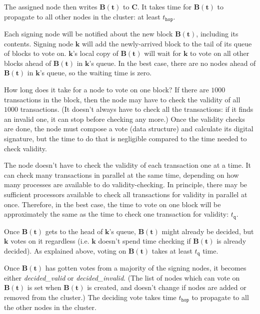 The assigned node then writes $\mathbf{B}(\mathbf{t})$ to $\mathbf{C}$. It takes time for $\mathbf{B}(\mathbf{t})$ to propagate to all other nodes in the cluster: at least $t_\mathtt{hop}$.

Each signing node will be notified about the new block $\mathbf{B}(\mathbf{t})$, including its contents. Signing node $\mathbf{k}$ will add the newly-arrived block to the tail of its queue of blocks to vote on. 
$\mathbf{k}$’s local copy of $\mathbf{B}(\mathbf{t})$ will wait for $\mathbf{k}$ to vote on all other blocks ahead of $\mathbf{B}(\mathbf{t})$ in $\mathbf{k}$’s queue. 
In the best case, there are no nodes ahead of $\mathbf{B}(\mathbf{t})$ in $\mathbf{k}$’s queue, so the waiting time is zero.

How long does it take for a node to vote on one block? 
If there are $1000$ transactions in the block, then the node may have to check the validity of all $1000$ transactions. 
(It doesn’t always have to check all the transactions: if it finds an invalid one, it can stop before checking any more.) 
Once the validity checks are done, the node must compose a vote (data structure) and calculate its digital signature, but the time to do that is negligible compared to the time needed to check validity.

The node doesn’t have to check the validity of each transaction one at a time. 
It can check many transactions in parallel at the same time, depending on how many processes are available to do validity-checking. 
In principle, there may be sufficient processors available to check all transactions for validity in parallel at once. 
Therefore, in the best case, the time to vote on one block will be approximately the same as the time to check one transaction for validity: $t_\mathtt{q}$.

Once $\mathbf{B}(\mathbf{t})$ gets to the head of $\mathbf{k}$’s queue, $\mathbf{B}(\mathbf{t})$ might already be decided, but $\mathbf{k}$ votes on it regardless (i.e. $\mathbf{k}$ doesn’t spend time checking if $\mathbf{B}(\mathbf{t})$ is already decided). 
As explained above, voting on $\mathbf{B}(\mathbf{t})$ takes at least $t_\mathtt{q}$ time.

Once $\mathbf{B}(\mathbf{t})$ has gotten votes from a majority of the signing nodes, it becomes either \textsf{\textit{decided\_valid}} or \textsf{\textit{decided\_invalid}}. 
(The list of nodes which can vote on $\mathbf{B}(\mathbf{t})$ is set when $\mathbf{B}(\mathbf{t})$ is created, and doesn’t change if nodes are added or removed from the cluster.) 
The deciding vote takes time $t_\mathtt{hop}$ to propagate to all the other nodes in the cluster.


